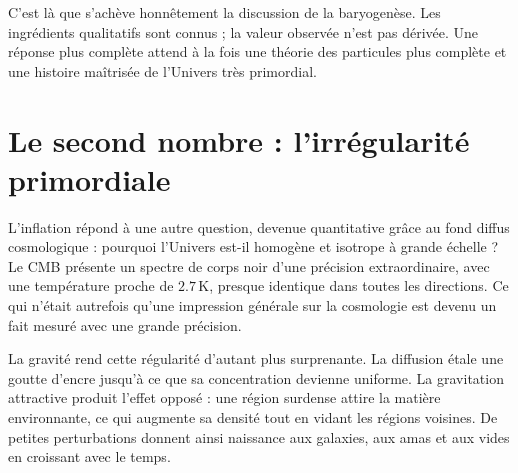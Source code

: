 \begin{classroomqa}
\end{classroomqa}

C’est là que s’achève honnêtement la discussion de la baryogenèse. Les ingrédients qualitatifs sont connus ; la valeur observée n’est pas dérivée. Une réponse plus complète attend à la fois une théorie des particules plus complète et une histoire maîtrisée de l’Univers très primordial.

\section{Le second nombre : l’irrégularité primordiale}

L’inflation répond à une autre question, devenue quantitative grâce au fond diffus cosmologique : pourquoi l’Univers est-il homogène et isotrope à grande échelle ? Le CMB présente un spectre de corps noir d’une précision extraordinaire, avec une température proche de \(2.7\,\mathrm K\), presque identique dans toutes les directions. Ce qui n’était autrefois qu’une impression générale sur la cosmologie est devenu un fait mesuré avec une grande précision.

La gravité rend cette régularité d’autant plus surprenante. La diffusion étale une goutte d’encre jusqu’à ce que sa concentration devienne uniforme. La gravitation attractive produit l’effet opposé : une région surdense attire la matière environnante, ce qui augmente sa densité tout en vidant les régions voisines. De petites perturbations donnent ainsi naissance aux galaxies, aux amas et aux vides en croissant avec le temps.

